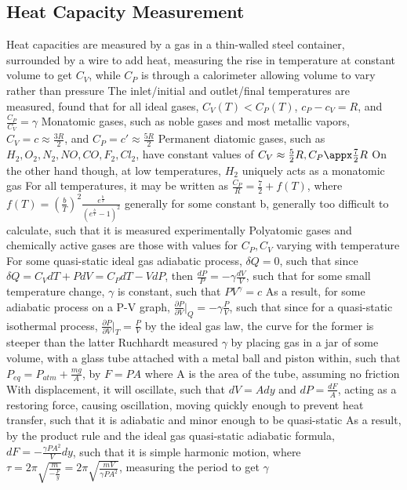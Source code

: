 \subsection{Heat Capacity Measurement}
\begin{outline*}
\1 Heat capacities are measured by a gas in a thin-walled steel container, surrounded by a wire to add heat, measuring the rise in temperature at constant volume to get $C_V$, while $C_P$ is through a calorimeter allowing volume to vary rather than pressure
\2 The inlet/initial and outlet/final temperatures are measured, found that for all ideal gases, $C_V(T) < C_P(T)$, $c_P - c_V = R$, and $\frac{C_P}{C_V} = \gamma$
\2 Monatomic gases, such as noble gases and most metallic vapors, $C_V = c \approx \frac{3R}{2}$, and $C_P = c' \approx \frac{5R}{2}$
\2 Permanent diatomic gases, such as $H_2, O_2, N_2, NO, CO, F_2, Cl_2$, have constant values of $C_V \approx \frac{5}{2}R, C_P \appx  \frac{7}{2}R$
\3 On the other hand though, at low temperatures, $H_2$ uniquely acts as a monatomic gas
\3 For all temperatures, it may be written as $\frac{C_P}{R} = \frac{7}{2} + f(T)$, where $f(T) = (\frac{b}{T})^2 \frac{e^{\frac{b}{T}}}{(e^{\frac{b}{T}} - 1)^2}$ generally for some constant b, generally too difficult to calculate, such that it is measured experimentally
\2 Polyatomic gases and chemically active gases are those with values for $C_P, C_V$ varying with temperature
\1 For some quasi-static ideal gas adiabatic process, $\delta Q = 0$, such that since $\delta Q = C_VdT + PdV = C_PdT - VdP$, then $\frac{dP}{P} = -\gamma \frac{dV}{V}$, such that for some small temperature change, $\gamma$ is constant, such that $PV^\gamma = c$
\2 As a result, for some adiabatic process on a P-V graph, $\frac{\partial P}{\partial V}|_Q = -\gamma \frac{P}{V}$, such that since for a quasi-static isothermal process, $\frac{\partial P}{\partial V}|_T = \frac{P}{V}$ by the ideal gas law, the curve for the former is steeper than the latter
\1 Ruchhardt measured $\gamma$ by placing gas in a jar of some volume, with a glass tube attached with a metal ball and piston within, such that $P_{eq} = P_{atm} + \frac{mg}{A}$, by $F = PA$  where A is the area of the tube, assuming no friction
\2 With displacement, it will oscillate, such that $dV = Ady$ and $dP = \frac{dF}{A}$, acting as a restoring force, causing oscillation, moving quickly enough to prevent heat transfer, such that it is adiabatic and minor enough to be quasi-static
\2 As a result, by the product rule and the ideal gas quasi-static adiabatic formula, $dF = -\frac{\gamma PA^2}{V}dy$, such that it is simple harmonic motion, where $\tau = 2\pi \sqrt{\frac{m}{-\frac{F}{y}}} = 2\pi \sqrt{\frac{mV}{\gamma PA^2}}$, measuring the period to get $\gamma$

\end{outline*}
